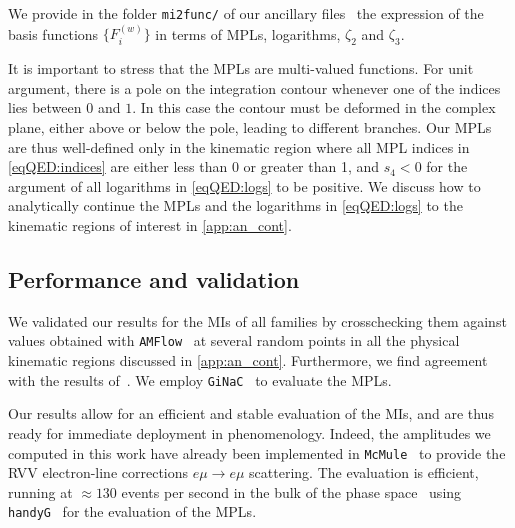 \documentclass[main.tex]{subfiles}
\begin{document}
We provide in the folder \texttt{mi2func/} of our ancillary files~\cite{zenodo} the expression of the basis functions $\{F^{(w)}_i\}$ in terms of \acp{MPL}, logarithms, $\zeta_2$ and $\zeta_3$.

\smallskip

It is important to stress that the \acp{MPL} are multi-valued functions.
For unit argument, there is a pole on the integration contour whenever one of the indices lies between $0$ and $1$. In this case the contour must be deformed in the complex plane, either above or below the pole, leading to different branches. Our \acp{MPL} are thus well-defined only in the 
kinematic region where all \ac{MPL} indices in \cref{eqQED:indices} are either less than 0 or greater than 1, and $s_4 < 0$ for the argument of all logarithms in \cref{eqQED:logs} to be positive. We discuss how to analytically continue the \acp{MPL} and the logarithms in \cref{eqQED:logs} to the kinematic regions of interest in \cref{app:an_cont}.



\subsection{Performance and validation}
\label{secQED:performance}

We validated our results for the \acp{MI} of all families by crosschecking them against values obtained with \texttt{AMFlow}~\cite{Liu:2022chg} at several random points in all the physical kinematic regions discussed in \cref{app:an_cont}. Furthermore, we find agreement with the results of~. We employ \texttt{GiNaC}~\cite{Bauer:2000cp,Vollinga:2004sn} to evaluate the \acp{MPL}.

Our results allow for an efficient and stable evaluation of the \acp{MI}, and are thus ready for immediate deployment in phenomenology. Indeed, the amplitudes we computed in this work have already been implemented in \texttt{McMule}~\cite{Banerjee:2020rww,ulrich_yannick_2022_6046769} to provide the \acl{RVV} electron-line corrections  $e \mu \to e \mu$ scattering. The evaluation is efficient, running at $\approx 130$ events per second in the bulk of the phase space~\cite{ulrich-radcor} using \texttt{handyG}~\cite{Naterop:2019xaf} for the evaluation of the \acp{MPL}.
\end{document}
